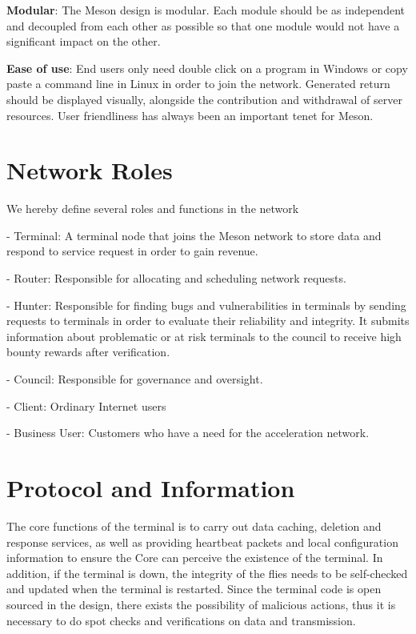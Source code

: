 \documentclass[12pt, a4paper, unicode]{report}
\begin{document}
    \textbf{Modular}: The Meson design is modular. Each module should be as independent and decoupled from each other as possible so that one module would not have a significant impact on the other.
    
    \textbf{Ease of use}: End users only need double click on a program in Windows or copy paste a command line in Linux in order to join the network. Generated return should be displayed visually, alongside the contribution and withdrawal of server resources. User friendliness has always been an important tenet for Meson.
    
    \section{Network Roles}
    We hereby define several roles and functions in the network

    - Terminal: A terminal node that joins the Meson network to store data and respond to service request in order to gain revenue.

    - Router: Responsible for allocating and scheduling network requests.
    
    - Hunter: Responsible for finding bugs and vulnerabilities in terminals by sending requests to terminals in order to evaluate their reliability and integrity. It submits information about problematic or at risk terminals to the council to receive high bounty rewards after verification.
    
    - Council: Responsible for governance and oversight.
    
    - Client: Ordinary Internet users
    
    - Business User: Customers who have a need for the acceleration network.

    
    \section{Protocol and Information}
    The core functions of the terminal is to carry out data caching, deletion and response services, as well as providing heartbeat packets and local configuration information to ensure the Core can perceive the existence of the terminal. In addition, if the terminal is down, the integrity of the flies needs to be self-checked and updated when the terminal is restarted. Since the terminal code is open sourced in the design, there exists the possibility of malicious actions, thus it is necessary to do spot checks and verifications on data and transmission.
    
\end{document}
